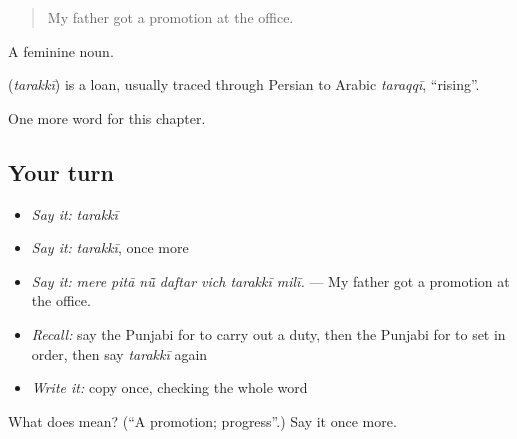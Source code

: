 \begin{quote}
My father got a promotion at the office.
\end{quote}

A feminine noun.

\begin{cousinweb}
\textbf{} (\emph{tarakkī}) is a loan, usually traced through Persian to Arabic \emph{taraqqī}, \textquotedblleft{}rising\textquotedblright{}.
\end{cousinweb}

\begin{grammarlens}[title={What you've built}]
One more word for this chapter.
\end{grammarlens}

\subsection*{Your turn}
\begin{itemize}
\raggedright
  \item \emph{Say it:} \emph{tarakkī}
  \item \emph{Say it:} \emph{tarakkī}, once more
  \item \emph{Say it:} \emph{mere pitā nū̃ daftar vich tarakkī milī.} — My father got a promotion at the office.
  \item \emph{Recall:} say the Punjabi for to carry out a duty, then the Punjabi for to set in order, then say \emph{tarakkī} again
  \item \emph{Write it:} copy \textbf{} once, checking the whole word
\end{itemize}

\begin{tcolorbox}[breakable,colback=teal!4,colframe=teal!35!black,title={Before you move on}]
What does  mean? (\textquotedblleft{}A promotion; progress\textquotedblright{}.) Say it once more.
\end{tcolorbox}
